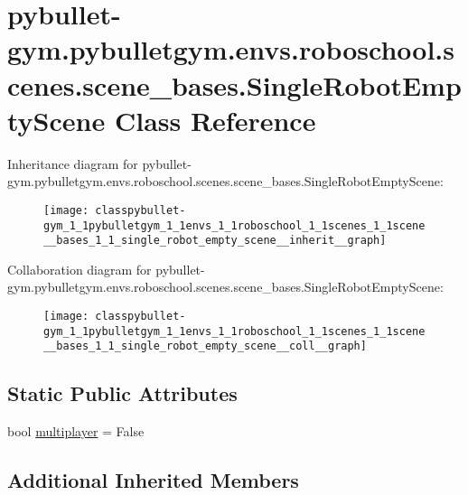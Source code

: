 \hypertarget{classpybullet-gym_1_1pybulletgym_1_1envs_1_1roboschool_1_1scenes_1_1scene__bases_1_1_single_robot_empty_scene}{}\section{pybullet-\/gym.pybulletgym.\+envs.\+roboschool.\+scenes.\+scene\+\_\+bases.\+Single\+Robot\+Empty\+Scene Class Reference}
\label{classpybullet-gym_1_1pybulletgym_1_1envs_1_1roboschool_1_1scenes_1_1scene__bases_1_1_single_robot_empty_scene}


Inheritance diagram for pybullet-\/gym.pybulletgym.\+envs.\+roboschool.\+scenes.\+scene\+\_\+bases.\+Single\+Robot\+Empty\+Scene\+:
\nopagebreak
\begin{figure}[H]
\begin{center}
\leavevmode
\texttt{[image: classpybullet-gym\_1\_1pybulletgym\_1\_1envs\_1\_1roboschool\_1\_1scenes\_1\_1scene\_\_bases\_1\_1\_single\_robot\_empty\_scene\_\_inherit\_\_graph]}
\end{center}
\end{figure}


Collaboration diagram for pybullet-\/gym.pybulletgym.\+envs.\+roboschool.\+scenes.\+scene\+\_\+bases.\+Single\+Robot\+Empty\+Scene\+:
\nopagebreak
\begin{figure}[H]
\begin{center}
\leavevmode
\texttt{[image: classpybullet-gym\_1\_1pybulletgym\_1\_1envs\_1\_1roboschool\_1\_1scenes\_1\_1scene\_\_bases\_1\_1\_single\_robot\_empty\_scene\_\_coll\_\_graph]}
\end{center}
\end{figure}
\subsection*{Static Public Attributes}
\begin{DoxyCompactItemize}
\item 
bool \hyperlink{classpybullet-gym_1_1pybulletgym_1_1envs_1_1roboschool_1_1scenes_1_1scene__bases_1_1_single_robot_empty_scene_a315ceb8e6a21f14f252249e80b74ef7d}{multiplayer} = False
\end{DoxyCompactItemize}
\subsection*{Additional Inherited Members}


